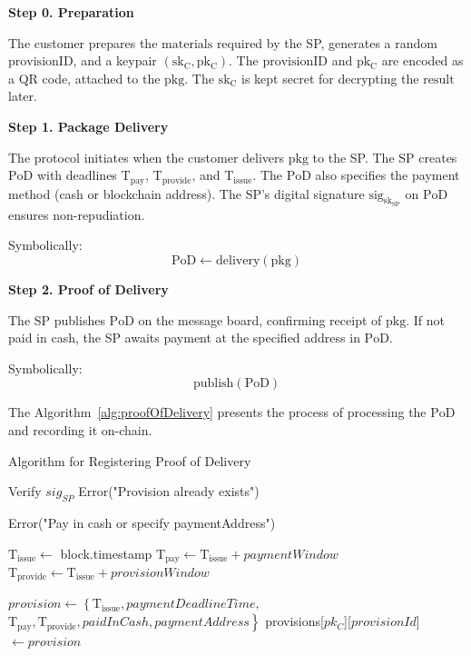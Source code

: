 \documentclass[pdftex,twocolumn,epjc3]{svjour3}
\begin{document}
\noindent \textbf{Step 0. Preparation}\label{step-0-preparation}

The customer prepares the $\mathrm{materials}$ required by the SP, generates a random $\mathrm{provisionID}$, and a keypair $(\mathrm{sk_C},\mathrm{pk_C})$. The $\mathrm{provisionID}$ and $\mathrm{pk_C}$ are encoded as a QR code, attached to the $\mathrm{pkg}$. The $\mathrm{sk_C}$ is kept secret for decrypting the $\mathrm{result}$ later.

\noindent \textbf{Step 1. Package Delivery}\label{step-1-package-delivery}

The protocol initiates when the customer delivers $\mathrm{pkg}$ to the SP. The SP creates $\mathrm{PoD}$ with deadlines $\mathrm{T}_\mathrm{pay}$, $\mathrm{T}_\mathrm{provide}$, and $\mathrm{T}_\mathrm{issue}$. The $\mathrm{PoD}$ also specifies the payment method (cash or blockchain address). The SP's digital signature $\mathrm{sig}_{\mathrm{sk}_\mathrm{SP}}$ on $\mathrm{PoD}$ ensures non-repudiation.

Symbolically: 
\[
\mathrm{PoD \gets delivery(pkg)}
\]

\noindent \textbf{Step 2. Proof of Delivery}\label{step-2-pod}

The SP publishes $\mathrm{PoD}$ on the message board, confirming receipt of $\mathrm{pkg}$. If not paid in cash, the SP awaits payment at the specified address in $\mathrm{PoD}$.

Symbolically: 
\[
\mathrm{publish(PoD)}
\]

The Algorithm~\ref{alg:proofOfDelivery} presents the process of processing the $\mathrm{PoD}$ and recording it on-chain.

\begin{algorithm}
\caption{Algorithm for Registering Proof of Delivery}
\label{alg:proofOfDelivery}
\begin{algorithmic}[1]
    \State Verify $sig_{SP}$
        \State \Return Error("Provision already exists")
    \EndIf

        \State \Return Error("Pay in cash or specify paymentAddress")
    \EndIf
    
    \State $\mathrm{T}_\mathrm{issue} \gets$ block.timestamp
    \State $\mathrm{T}_\mathrm{pay} \gets \mathrm{T}_\mathrm{issue} + paymentWindow$
    \State $\mathrm{T}_\mathrm{provide} \gets \mathrm{T}_\mathrm{issue} + provisionWindow$

    \State $provision \gets \left\{ \mathrm{T}_\mathrm{issue}, paymentDeadlineTime, \right.$
    \State \hspace{\algorithmicindent}$\left. \mathrm{T}_\mathrm{pay}, \mathrm{T}_\mathrm{provide}, paidInCash, paymentAddress \right\}$
    \State provisions[$pk_C$][$provisionId$] $\gets provision$
\EndFunction
\end{algorithmic}
\end{algorithm}
\end{document}
